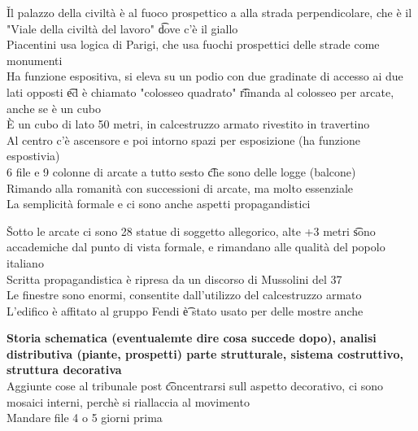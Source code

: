 \documentclass[12pt]{article}
\begin{document}
\v

Il palazzo della civiltà è al fuoco prospettico a alla strada perpendicolare, che è il "Viale della civiltà del lavoro" \t dove c'è il giallo \\
Piacentini usa logica di Parigi, che usa fuochi prospettici delle strade come monumenti \\
Ha funzione espositiva, si eleva su un podio con due gradinate di accesso ai due lati opposti \t ed è chiamato "colosseo quadrato" \t rimanda al colosseo per arcate, anche se è un cubo \\
È un cubo di lato 50 metri, in calcestruzzo armato rivestito in travertino \\
Al centro c'è ascensore e poi intorno spazi per esposizione (ha funzione espostivia) \\
6 file e 9 colonne di arcate a tutto sesto \t che sono delle logge (balcone) \\
Rimando alla romanità con successioni di arcate, ma molto essenziale \\
La semplicità formale e ci sono anche aspetti propagandistici

\v

Sotto le arcate ci sono 28 statue di soggetto allegorico, alte +3 metri \t sono accademiche dal punto di vista formale, e rimandano alle qualità del popolo italiano \\
Scritta propagandistica è ripresa da un discorso di Mussolini del 37 \\
Le finestre sono enormi, consentite dall'utilizzo del calcestruzzo armato \\
L'edifico è affitato al gruppo Fendi \t è stato usato per delle mostre anche

\v

\textbf{Storia schematica (eventualemte dire cosa succede dopo), analisi distributiva (piante, prospetti) parte strutturale, sistema costruttivo, struttura decorativa} \\
Aggiunte cose al tribunale post \t concentrarsi sull aspetto decorativo, ci sono mosaici interni, perchè si riallaccia al movimento \\
Mandare file 4 o 5 giorni prima
\end{document}
